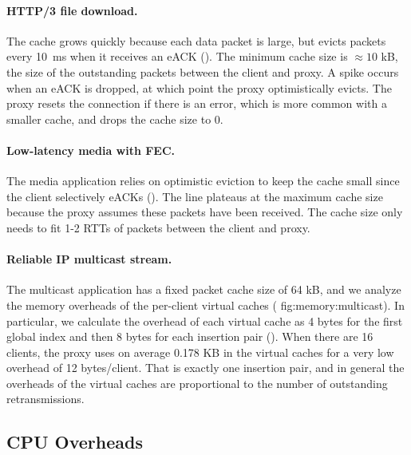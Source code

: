 \paragraph{HTTP/3 file download.}

The cache grows quickly because each data packet is large, but evicts
packets every 10~ms when
it receives an eACK (). The minimum cache size is
$\approx\!10$ kB, the size of the outstanding packets between the client and
proxy. A spike occurs when an eACK is dropped, at which point the proxy
optimistically evicts. The proxy resets the connection if there is an
error, which is more common with a smaller cache, and drops the cache
size to 0.

\paragraph{Low-latency media with FEC.}

The media application relies on optimistic eviction to keep the cache small
since the client selectively eACKs (). The
line plateaus at the maximum cache size because the proxy
assumes these packets have been received. The cache size only needs to fit 1-2
RTTs of packets between the client and proxy.

\paragraph{Reliable IP multicast stream.}

The multicast application has a fixed packet cache size of 64 kB, and we analyze
the memory overheads of the per-client virtual caches (\Cref
{fig:memory:multicast}). In particular, we calculate the overhead of each
virtual cache as 4 bytes for the first global index and then 8 bytes for each
insertion pair (). When there are 16 clients,
the proxy uses on average 0.178 KB in the virtual caches for a very low
overhead of 12 bytes/client. That is exactly one insertion pair, and in general
the overheads of the virtual caches are proportional to the number of
outstanding retransmissions.

\subsection{CPU Overheads}

  
